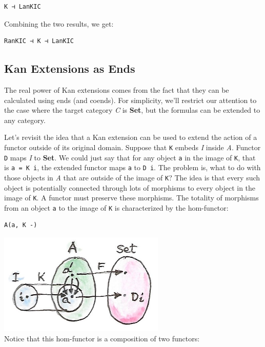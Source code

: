 \begin{verbatim}
K ⊣ LanKIC
\end{verbatim}

Combining the two results, we get:

\begin{verbatim}
RanKIC ⊣ K ⊣ LanKIC
\end{verbatim}

\subsection{Kan Extensions as Ends}\label{kan-extensions-as-ends}

The real power of Kan extensions comes from the fact that they can be
calculated using ends (and coends). For simplicity, we'll restrict our
attention to the case where the target category \emph{C} is
\textbf{Set}, but the formulas can be extended to any category.

Let's revisit the idea that a Kan extension can be used to extend the
action of a functor outside of its original domain. Suppose that
\texttt{K} embeds \emph{I} inside \emph{A}. Functor \texttt{D} maps
\emph{I} to \textbf{Set}. We could just say that for any object
\texttt{a} in the image of \texttt{K}, that is \texttt{a\ =\ K\ i}, the
extended functor maps \texttt{a} to \texttt{D\ i}. The problem is, what
to do with those objects in \emph{A} that are outside of the image of
\texttt{K}? The idea is that every such object is potentially connected
through lots of morphisms to every object in the image of \texttt{K}. A
functor must preserve these morphisms. The totality of morphisms from an
object \texttt{a} to the image of \texttt{K} is characterized by the
hom-functor:

\begin{verbatim}
A(a, K -)
\end{verbatim}

\includegraphics[width=3.12500in]{images/kan13.jpg}\\
Notice that this hom-functor is a composition of two functors:

